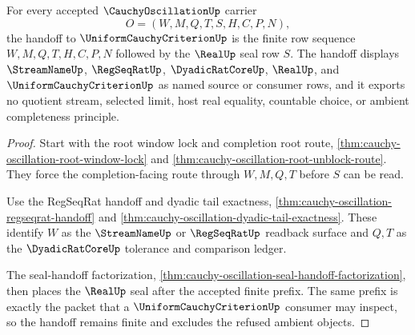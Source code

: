 \begin{theorem}
\label{thm:cauchy-oscillation-uniform-criterion-handoff}
For every accepted $\CauchyOscillationUp$ carrier
$$
O=(W,M,Q,T,S,H,C,P,N),
$$
the handoff to $\UniformCauchyCriterionUp$ is the finite row sequence $W,M,Q,T,H,C,P,N$ followed by the $\RealUp$ seal row $S$. The handoff displays $\StreamNameUp$, $\RegSeqRatUp$, $\DyadicRatCoreUp$, $\RealUp$, and $\UniformCauchyCriterionUp$ as named source or consumer rows, and it exports no quotient stream, selected limit, host real equality, countable choice, or ambient completeness principle.
\end{theorem}
\begin{proof}
Start with the root window lock and completion root route, \autoref{thm:cauchy-oscillation-root-window-lock} and \autoref{thm:cauchy-oscillation-root-unblock-route}. They force the completion-facing route through $W,M,Q,T$ before $S$ can be read.

Use the RegSeqRat handoff and dyadic tail exactness, \autoref{thm:cauchy-oscillation-regseqrat-handoff} and \autoref{thm:cauchy-oscillation-dyadic-tail-exactness}. These identify $W$ as the $\StreamNameUp$ or $\RegSeqRatUp$ readback surface and $Q,T$ as the $\DyadicRatCoreUp$ tolerance and comparison ledger.

The seal-handoff factorization, \autoref{thm:cauchy-oscillation-seal-handoff-factorization}, then places the $\RealUp$ seal after the accepted finite prefix. The same prefix is exactly the packet that a $\UniformCauchyCriterionUp$ consumer may inspect, so the handoff remains finite and excludes the refused ambient objects.
\end{proof}

